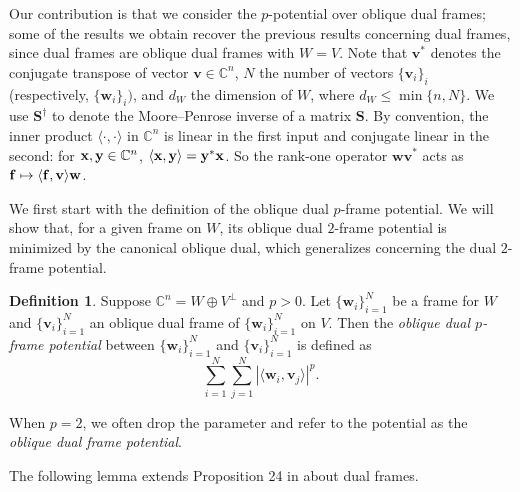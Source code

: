 \documentclass{amsart}
\numberwithin{equation}{section}
\renewcommand\min{{\operatorname{min}}}
\newcommand{\bw}{{\mathbf w}}
\newcommand{\bv}{{\mathbf v}}
\theoremstyle{plain}
\theoremstyle{remark}
\theoremstyle{definition}
\newtheorem{definition}[theorem]{Definition}
\begin{document}
Our contribution is that we consider the $p$-potential over oblique dual frames; some of the results we obtain recover the previous results concerning dual frames, since dual frames are oblique dual frames with $W=V$. 
Note that $\mathbf{v}^*$ denotes the conjugate transpose of vector $\mathbf{v} \in \mathbb{C}^n$, $N$ the number of vectors $\{\bv_i\}_i$ (respectively, $\{\bw_i\}_i)$, and $d_W$ the dimension of $W$, where $d_W \le \min\{n, N\}$.
We use $\mathbf{S}^\dagger$ to denote the Moore–Penrose inverse of a matrix $\mathbf{S}$.  By convention,  the inner product $\langle \cdot, \cdot \rangle$ in $\mathbb{C}^n$ is linear in the first input and conjugate linear in the second: for $ {\bf x}, {\bf y} \in\mathbb{C}^n$, $\langle {\bf x}, {\bf y} \rangle = {\bf y}^*{\bf x}$. 
 So the rank-one operator $\bw \bv^\ast$ acts as ${\bf f} \mapsto \langle {\bf f}, \bv \rangle \bw$.


We first start with the definition of the oblique dual $p$-frame potential.  We will show that, for a given frame on $W$, its oblique dual $2$-frame potential is minimized by the canonical oblique dual, which generalizes \cite[Theorem 2.2]{christensen2020equiangular} concerning the dual $2$-frame potential.

\begin{definition}
    Suppose $\mathbb{C}^n = W \oplus V^\perp$ and $p>0$. Let $\{\mathbf{w}_i\}_{i=1}^N$ be a frame for $W$ and $\{\mathbf{v}_i\}_{i=1}^N$ an oblique dual frame of $\{\mathbf{w}_i\}_{i=1}^N$ on $V$. Then the \textit{oblique dual $p$-frame potential} between $\{\mathbf{w}_i\}_{i=1}^N$ and $\{\mathbf{v}_i\}_{i=1}^N$ is defined as
    \begin{equation*}
       \sum_{i=1}^N \sum_{j=1}^N |\langle \mathbf{w}_i, \mathbf{v}_j \rangle |^p. 
    \end{equation*}
\end{definition}
  When $p=2$, we often drop the parameter and refer to the potential as the \textit{oblique dual frame potential}.

The following lemma extends Proposition 24 in \cite{aceska2022cross} about dual frames.
\end{document}
